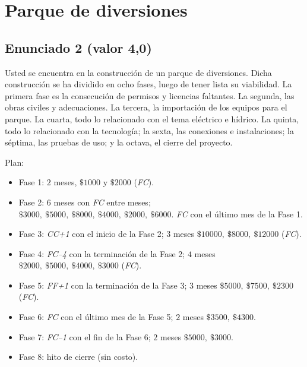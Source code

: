 \section{Parque de diversiones}

\subsection*{Enunciado 2 (valor 4,0)}

Usted se encuentra en la construcción de un parque de diversiones. Dicha construcción se ha dividido en ocho fases, luego de tener lista su viabilidad. La primera fase es la consecución de permisos y licencias faltantes. La segunda, las obras civiles y adecuaciones. La tercera, la importación de los equipos para el parque. La cuarta, todo lo relacionado con el tema eléctrico e hídrico. La quinta, todo lo relacionado con la tecnología; la sexta, las conexiones e instalaciones; la séptima, las pruebas de uso; y la octava, el cierre del proyecto.

\medskip
Plan:
\begin{itemize}
  \item Fase 1: \(2\) meses, \(\$1000\) y \(\$2000\) (\emph{FC}).
  \item Fase 2: \(6\) meses con \emph{FC} entre meses; \(\$3000,~\$5000,~\$8000,~\$4000,~\$2000,~\$6000\). \emph{FC} con el último mes de la Fase 1.
  \item Fase 3: \emph{CC+1} con el inicio de la Fase 2; \(3\) meses \(\$10000,~\$8000,~\$12000\) (\emph{FC}).
  \item Fase 4: \emph{FC--4} con la terminación de la Fase 2; \(4\) meses \(\$2000,~\$5000,~\$4000,~\$3000\) (\emph{FC}).
  \item Fase 5: \emph{FF+1} con la terminación de la Fase 3; \(3\) meses \(\$5000,~\$7500,~\$2300\) (\emph{FC}).
  \item Fase 6: \emph{FC} con el último mes de la Fase 5; \(2\) meses \(\$3500,~\$4300\).
  \item Fase 7: \emph{FC--1} con el fin de la Fase 6; \(2\) meses \(\$5000,~\$3000\).
  \item Fase 8: hito de cierre (sin costo).
\end{itemize}

